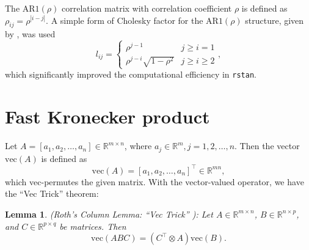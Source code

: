 \documentclass[a4paper]{article}   	%
\newtheorem{lemma}[theorem]{Lemma}
\newcommand{\rstan}{\texttt{rstan}}
\newcommand{\AR}{\mathrm{AR}1}
\begin{document}
	The $\AR(\rho)$ correlation matrix with correlation coefficient $\rho$ is defined as $\rho_{ij} = \rho^{|i-j|}$. A simple form of Cholesky factor for the $\AR(\rho)$ structure, given by \textcite{Madar2015Direct}, was used 
	\begin{equation}
		l_{ij} = \begin{cases}
			\rho^{j-1} & j\geq i =1 \\
			\rho^{j-i} \sqrt{1-\rho^2} & j\geq i \geq2
		\end{cases},
	\end{equation}
	which significantly improved the computational efficiency in \rstan. 
	
	\section{Fast Kronecker product}\label{sec:kronec}
	
	
	
	Let $A=[a_1,a_2,\ldots,a_n]\in \mathbb{R}^{m\times n}$, where $a_j\in\mathbb{R}^m, j=1,2,\ldots,n$. Then the vector $\mbox{vec}(A)$ is defined as 
	\begin{equation}
		\mbox{vec}(A) = [a_1,a_2,\ldots,a_n]^\top \in \mathbb{R}^{mn}, 
	\end{equation}
	which vec-permutes the given matrix. With the vector-valued operator, we have the ``Vec Trick'' theorem: 	
	\begin{lemma} (Roth's Column Lemma: ``Vec Trick'' \parencite{Roth1934Direct, Airola2018Fast} ): Let $A \in \mathbb{R}^{m\times n}$, $B \in \mathbb{R}^{n\times p}$, and $C \in \mathbb{R}^{p\times q}$ be matrices. Then
			\begin{equation}
			 \mbox{vec}(ABC) =	(C^\top \otimes A)\mbox{vec}(B). 
			\end{equation}
	\end{lemma}
	
\end{document}
